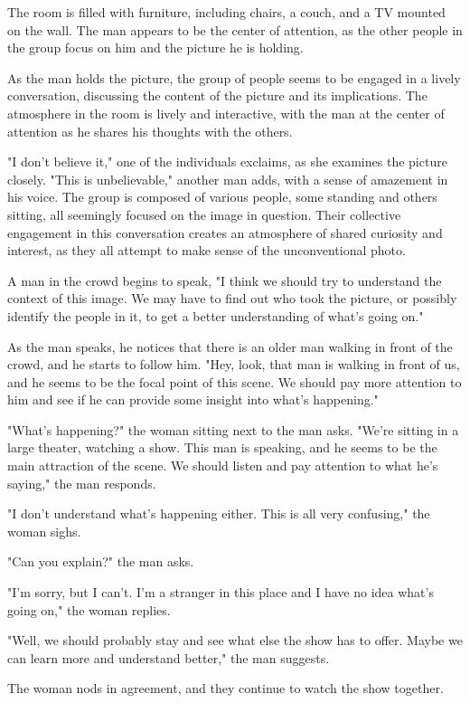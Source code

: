 \documentclass[smalldemyvopaper,11pt,twoside,onecolumn,openright,extrafontsizes]{memoir}
\begin{document}
The room is filled with furniture, including chairs, a couch, and a TV mounted on the wall. The man appears to be the center of attention, as the other people in the group focus on him and the picture he is holding.\par
As the man holds the picture, the group of people seems to be engaged in a lively conversation, discussing the content of the picture and its implications. The atmosphere in the room is lively and interactive, with the man at the center of attention as he shares his thoughts with the others.\par
"I don't believe it," one of the individuals exclaims, as she examines the picture closely. "This is unbelievable," another man adds, with a sense of amazement in his voice. The group is composed of various people, some standing and others sitting, all seemingly focused on the image in question. Their collective engagement in this conversation creates an atmosphere of shared curiosity and interest, as they all attempt to make sense of the unconventional photo.\par
A man in the crowd begins to speak, "I think we should try to understand the context of this image. We may have to find out who took the picture, or possibly identify the people in it, to get a better understanding of what's going on."\par
As the man speaks, he notices that there is an older man walking in front of the crowd, and he starts to follow him. "Hey, look, that man is walking in front of us, and he seems to be the focal point of this scene. We should pay more attention to him and see if he can provide some insight into what's happening."\par
"What's happening?" the woman sitting next to the man asks. "We're sitting in a large theater, watching a show. This man is speaking, and he seems to be the main attraction of the scene. We should listen and pay attention to what he's saying," the man responds.\par
"I don't understand what's happening either. This is all very confusing," the woman sighs.\par
"Can you explain?" the man asks.\par
"I'm sorry, but I can't. I'm a stranger in this place and I have no idea what's going on," the woman replies.\par
"Well, we should probably stay and see what else the show has to offer. Maybe we can learn more and understand better," the man suggests.\par
The woman nods in agreement, and they continue to watch the show together.\par
\end{document}
